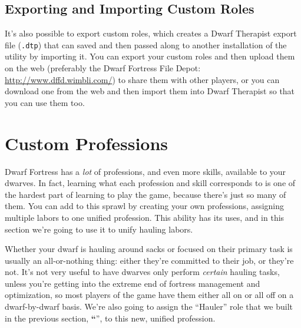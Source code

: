 \documentclass[]{article}
\newcommand{\jump}[1] {\textbf{``\nameref{sec:#1}}''}
\begin{document}
\subsection{Exporting and Importing Custom Roles}
It's also possible to export custom roles, which creates a Dwarf Therapist export file (\texttt{.dtp})
that can saved and then passed along to another installation of the utility by importing it. You can
export your custom roles and then upload them on the web (preferably the Dwarf Fortress File Depot:
\url{http://www.dffd.wimbli.com/}) to share them with other players, or you can download one from the web
and then import them into Dwarf Therapist so that you can use them too.

\section{Custom Professions}
Dwarf Fortress has a \emph{lot} of professions, and even more skills, available to your dwarves. In fact,
learning what each profession and skill corresponds to is one of the hardest part of learning to play
the game, because there's just so many of them. You can add to this sprawl by creating your own
professions, assigning multiple labors to one unified profession. This ability has its uses, and in this
section we're going to use it to unify hauling labors.

Whether your dwarf is hauling around sacks or focused on their primary task is usually an all-or-nothing
thing: either they're committed to their job, or they're not. It's not very useful to have dwarves only
perform \emph{certain} hauling tasks, unless you're getting into the extreme end of fortress management
and optimization, so most players of the game have them either all on or all off on a dwarf-by-dwarf
basis. We're also going to assign the ``Hauler'' role that we built in the previous section,
\jump{Creating Custom Roles}, to this new, unified profession.
\end{document}
